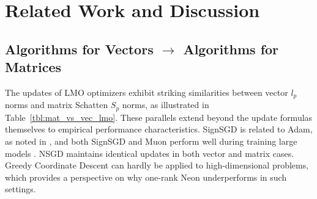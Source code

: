 \documentclass[smallextended,referee,envcountsect]{svjour3}
\newcommand{\tableref}[1]{Table~\ref{#1}}
\begin{document}
 \section{Related Work and Discussion}
 
 \subsection{Algorithms for Vectors $\rightarrow$ Algorithms for Matrices}
 
 The updates of LMO optimizers exhibit striking similarities between vector $l_p$ norms and matrix Schatten $S_p$ norms, as illustrated in \tableref{tbl:mat_vs_vec_lmo}. These parallels extend beyond the update formulas themselves to empirical performance characteristics. SignSGD is related to Adam, as noted in \citep{bernstein2024oldoptimizernewnorm}, and both SignSGD and Muon perform well during training large models \citep{zhao2025deconstructing,liu2025muonscalablellmtraining}. NSGD maintains identical updates in both vector and matrix cases. Greedy Coordinate Descent can hardly be applied to high-dimensional problems, which provides a perspective on why one-rank Neon underperforms in such settings.
 
\end{document}
